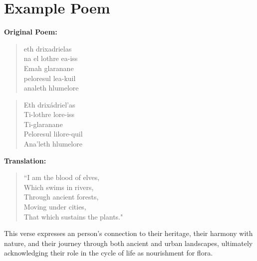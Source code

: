 
\onecolumn
\section*{Example Poem}
\textbf{Original Poem:}


\begin{quote}
{\fontsize{30pt}{10pt}\tovian
eth drixadrielas\\
na el lothre ea-iss\\
Emah glaranane\\
peloresul lea-kuil \\
analeth hlumelore
}
\end{quote}



\begin{quote}
Eth drixádriel'as\\
Ti-lothre lore-iss \\
Ti-glaranane\\
Peloresul lilore-quil \\
Ana'leth hlumelore
\end{quote}

\textbf{Translation:}
\begin{quote}
``I am the blood of elves,\\
Which swims in rivers,\\
Through ancient forests,\\
Moving under cities,\\
That which sustains the plants."
\end{quote}

This verse expresses an person's connection to their heritage, their harmony with nature, and their journey through both ancient and urban landscapes, ultimately acknowledging their role in the cycle of life as nourishment for flora.
